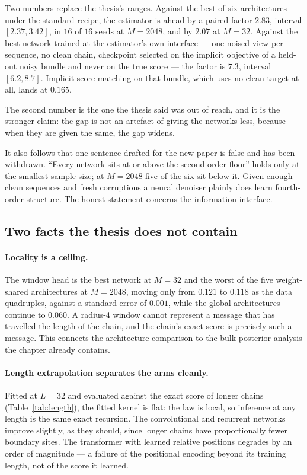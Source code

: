 \documentclass[11pt,a4paper]{article}
\begin{document}
Two numbers replace the thesis's ranges. Against the best of six architectures under the standard
recipe, the estimator is ahead by a paired factor $2.83$, interval $[2.37,3.42]$, in $16$ of $16$
seeds at $M=2048$, and by $2.07$ at $M=32$. Against the best network trained at the estimator's own
interface --- one noised view per sequence, no clean chain, checkpoint selected on the implicit
objective of a held-out noisy bundle and never on the true score --- the factor is $7.3$, interval
$[6.2,8.7]$. Implicit score matching on that bundle, which uses no clean target at all, lands at
$0.165$.

The second number is the one the thesis said was out of reach, and it is the stronger claim: the
gap is not an artefact of giving the networks less, because when they are given the same, the gap
widens.

It also follows that one sentence drafted for the new paper is false and has been withdrawn.
``Every network sits at or above the second-order floor'' holds only at the smallest sample size;
at $M=2048$ five of the six sit below it. Given enough clean sequences and fresh corruptions a
neural denoiser plainly does learn fourth-order structure. The honest statement concerns the
information interface.

\subsection{Two facts the thesis does not contain}

\paragraph{Locality is a ceiling.}
The window head is the best network at $M=32$ and the worst of the five weight-shared
architectures at $M=2048$, moving only from $0.121$ to $0.118$ as the data quadruples, against a
standard error of $0.001$, while the global architectures continue to $0.060$. A radius-4 window
cannot represent a message that has travelled the length of the chain, and the chain's exact score
is precisely such a message. This connects the architecture comparison to the bulk-posterior
analysis the chapter already contains.

\paragraph{Length extrapolation separates the arms cleanly.}
Fitted at $L=32$ and evaluated against the exact score of longer chains
(Table~\ref{tab:length}), the fitted kernel is flat: the law is local, so inference at any length
is the same exact recursion. The convolutional and recurrent networks improve slightly, as they
should, since longer chains have proportionally fewer boundary sites. The transformer with learned
relative positions degrades by an order of magnitude --- a failure of the positional encoding
beyond its training length, not of the score it learned.
\end{document}
